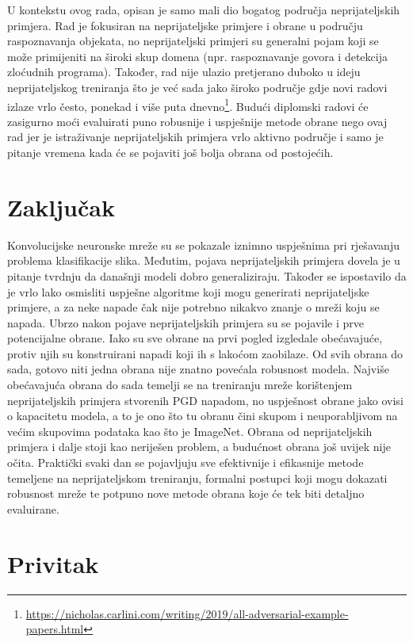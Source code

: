 \documentclass[utf8, diplomski]{fer}
\begin{document}
U kontekstu ovog rada, opisan je samo mali dio bogatog područja neprijateljskih primjera. Rad je fokusiran na neprijateljske primjere i obrane u području raspoznavanja objekata, no neprijateljski primjeri su generalni pojam koji se može primijeniti na široki skup domena (npr. raspoznavanje govora i detekcija zloćudnih programa). Također, rad nije ulazio pretjerano duboko u ideju neprijateljskog treniranja što je već sada jako široko područje gdje novi radovi izlaze vrlo često, ponekad i više puta dnevno\footnote{\url{https://nicholas.carlini.com/writing/2019/all-adversarial-example-papers.html}}. Budući diplomski radovi će zasigurno moći evaluirati puno robusnije i uspješnije metode obrane nego ovaj rad jer je istraživanje neprijateljskih primjera vrlo aktivno područje i samo je pitanje vremena kada će se pojaviti još bolja obrana od postojećih. 

\chapter{Zaključak}
Konvolucijske neuronske mreže su se pokazale iznimno uspješnima pri rješavanju problema klasifikacije slika. Međutim, pojava neprijateljskih primjera dovela je u pitanje tvrdnju da današnji modeli dobro generaliziraju. Također se ispostavilo da je vrlo lako osmisliti uspješne algoritme koji mogu generirati neprijateljske primjere, a za neke napade čak nije potrebno nikakvo znanje o mreži koju se napada. Ubrzo nakon pojave neprijateljskih primjera su se pojavile i prve potencijalne obrane. Iako su sve obrane na prvi pogled izgledale obećavajuće, protiv njih su konstruirani napadi koji ih s lakoćom zaobilaze. Od svih obrana do sada, gotovo niti jedna obrana nije znatno povećala robusnost modela. Najviše obećavajuća obrana do sada temelji se na treniranju mreže korištenjem neprijateljskih primjera stvorenih PGD napadom, no uspješnost obrane jako ovisi o kapacitetu modela, a to je ono što tu obranu čini skupom i neuporabljivom na većim skupovima podataka kao što je ImageNet. Obrana od neprijateljskih primjera i dalje stoji kao neriješen problem, a budućnost obrana još uvijek nije očita. Praktički svaki dan se pojavljuju sve efektivnije i efikasnije metode temeljene na neprijateljskom treniranju, formalni postupci koji mogu dokazati robusnost mreže te potpuno nove metode obrana koje će tek biti detaljno evaluirane. 





\chapter{Privitak}\label{dodatak}
\end{document}
